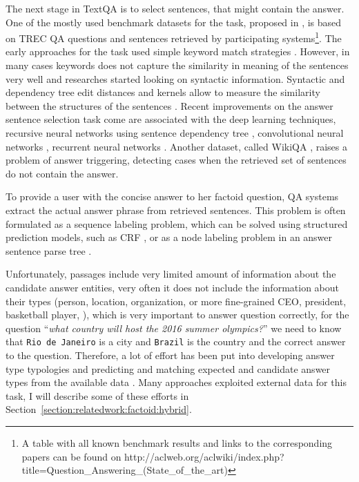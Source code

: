 The next stage in TextQA is to select sentences, that might contain the answer.
One of the mostly used benchmark datasets for the task, proposed in \cite{wang2007jeopardy}, is based on TREC QA questions and sentences retrieved by participating systems\footnote{A table with all known benchmark results and links to the corresponding papers can be found on http://aclweb.org/aclwiki/index.php?title=Question\_Answering\_(State\_of\_the\_art)}.
The early approaches for the task used simple keyword match strategies \cite{ittycheriah2001ibm,soubbotin2001patterns}.
However, in many cases keywords does not capture the similarity in meaning of the sentences very well and researches started looking on syntactic information.
Syntactic and dependency tree edit distances and kernels allow to measure the similarity between the structures of the sentences \cite{punyakanok2004mapping,shen2005exploring,heilman2010tree,yao2013answer,wang2010probabilistic}.
Recent improvements on the answer sentence selection task come are associated with the deep learning techniques, \eg recursive neural networks using sentence dependency tree \cite{iyyer2014neural}, convolutional neural networks \cite{yu2014deep,santos2016attentive}, recurrent neural networks \cite{tan2015lstm,WangN15}.
Another dataset, called WikiQA \cite{yang2015wikiqa}, raises a problem of answer triggering, \ie detecting cases when the retrieved set of sentences do not contain the answer.

To provide a user with the concise answer to her factoid question, QA systems extract the actual answer phrase from retrieved sentences.
This problem is often formulated as a sequence labeling problem, which can be solved using structured prediction models, such as CRF \cite{yao2013answer}, or as a node labeling problem in an answer sentence parse tree \cite{malon2013answer}.

Unfortunately, passages include very limited amount of information about the candidate answer entities, \ie very often it does not include the information about their types (person, location, organization, or more fine-grained CEO, president, basketball player, \etc), which is very important to answer question correctly, \eg for the question ``\textit{what country will host the 2016 summer olympics?}'' we need to know that \texttt{Rio de Janeiro} is a city and \texttt{Brazil} is the country and the correct answer to the question.
Therefore, a lot of effort has been put into developing answer type typologies \cite{hovy2000question,Hovy:2002:QTS:1289189.1289206} and predicting and matching expected and candidate answer types from the available data \cite{LiRoth02,li2006learning, prager2006question}.
Many approaches exploited external data for this task, I will describe some of these efforts in Section~\ref{section:relatedwork:factoid:hybrid}.

